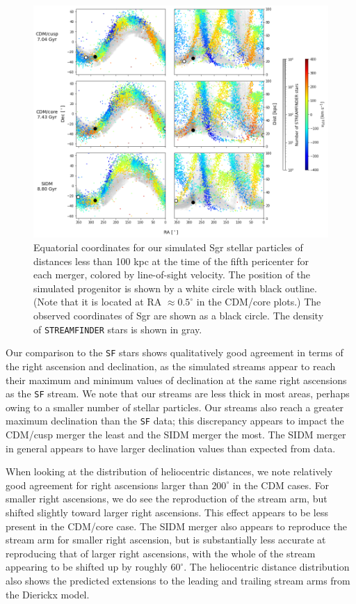 \begin{figure}
    \centering 
    \includegraphics[width=1.0\linewidth]{figs/equatorial_streamfinder.png}
    \caption{%
        Equatorial coordinates for our simulated Sgr stellar particles of
        distances less than 100 kpc at the time of the fifth pericenter for
        each merger, colored by line-of-sight velocity.  The position of the
        simulated progenitor is shown by a white circle with black outline.
        (Note that it is located at RA $\approx 0.5^\circ$ in the CDM/core
        plots.) The observed coordinates of Sgr are shown as a black circle.
        The density of \texttt{STREAMFINDER} stars is shown in gray.
    }
    \label{fig:equatorial}
\end{figure}

Our comparison to the \verb|SF| stars shows qualitatively good agreement in
terms of the right ascension and declination, as the simulated streams appear
to reach their maximum and minimum values of declination at the same right
ascensions as the \verb|SF| stream.  We note that our streams are less thick
in most areas, perhaps owing to a smaller number of stellar particles.  Our
streams also reach a greater maximum declination than the \verb|SF| data; this
discrepancy appears to impact the CDM/cusp merger the least and the SIDM
merger the most.  The SIDM merger in general appears to have larger
declination values than expected from data.

When looking at the distribution of heliocentric distances, we note relatively
good agreement for right ascensions larger than $200^\circ$ in the CDM cases.
For smaller right ascensions, we do see the reproduction of the stream arm, but
shifted slightly toward larger right ascensions. This effect appears to be
less present in the CDM/core case. The SIDM merger also appears to reproduce the
stream arm for smaller right ascension, but is substantially less accurate at
reproducing that of larger right ascensions, with the whole of the stream
appearing to be shifted up by roughly $60^\circ$. The heliocentric distance
distribution also shows the predicted extensions to the leading and trailing
stream arms from the Dierickx model. 

